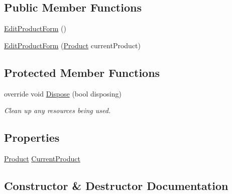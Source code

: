 \subsection*{Public Member Functions}
\begin{DoxyCompactItemize}
\item 
\hyperlink{class_health___assignment_1_1_edit_product_form_a863486f8bdb5bca61ad3df1de9e005e2}{Edit\+Product\+Form} ()
\item 
\hyperlink{class_health___assignment_1_1_edit_product_form_a16100c1a190a5282830f412ba811f012}{Edit\+Product\+Form} (\hyperlink{class_health___assignment_1_1_product}{Product} current\+Product)
\end{DoxyCompactItemize}
\subsection*{Protected Member Functions}
\begin{DoxyCompactItemize}
\item 
override void \hyperlink{class_health___assignment_1_1_edit_product_form_a5fccdf9956c74b788dda44116c654389}{Dispose} (bool disposing)
\begin{DoxyCompactList}\small\item\em Clean up any resources being used. \end{DoxyCompactList}\end{DoxyCompactItemize}
\subsection*{Properties}
\begin{DoxyCompactItemize}
\item 
\hyperlink{class_health___assignment_1_1_product}{Product} \hyperlink{class_health___assignment_1_1_edit_product_form_a4951d94bd1a86fefc8314b6d4a822962}{Current\+Product}
\end{DoxyCompactItemize}


\subsection{Constructor \& Destructor Documentation}
\mbox{\label{class_health___assignment_1_1_edit_product_form_a863486f8bdb5bca61ad3df1de9e005e2}} 
